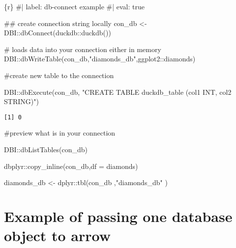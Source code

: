 \documentclass[
  letterpaper,
  DIV=11,
  numbers=noendperiod]{scrreprt}
\newenvironment{Shaded}{\begin{snugshade}}{\end{snugshade}}
\newcommand{\AttributeTok}[1]{\textcolor[rgb]{0.40,0.45,0.13}{#1}}
\newcommand{\FunctionTok}[1]{\textcolor[rgb]{0.28,0.35,0.67}{#1}}
\newcommand{\InformationTok}[1]{\textcolor[rgb]{0.37,0.37,0.37}{#1}}
\newcommand{\NormalTok}[1]{\textcolor[rgb]{0.00,0.23,0.31}{#1}}
\newcommand{\OtherTok}[1]{\textcolor[rgb]{0.00,0.23,0.31}{#1}}
\newcommand{\SpecialCharTok}[1]{\textcolor[rgb]{0.37,0.37,0.37}{#1}}
\newcommand{\StringTok}[1]{\textcolor[rgb]{0.13,0.47,0.30}{#1}}
\begin{document}
\begin{Shaded}
\begin{Highlighting}[]
\InformationTok{\textasciigrave{}\textasciigrave{}\textasciigrave{}\{r\}}
\InformationTok{\#| label: db{-}connect example}
\InformationTok{\#| eval: true}

\InformationTok{\#\# create connection string locally}
\InformationTok{con\_db \textless{}{-} DBI::dbConnect(duckdb::duckdb())}

\InformationTok{\# loads data into your connection either in memory}
\InformationTok{DBI::dbWriteTable(con\_db,"diamonds\_db",ggplot2::diamonds)}

\InformationTok{\#create new table to the connection}

\InformationTok{DBI::dbExecute(con\_db, "CREATE TABLE duckdb\_table (col1 INT, col2 STRING)")}
\InformationTok{\textasciigrave{}\textasciigrave{}\textasciigrave{}}
\end{Highlighting}
\end{Shaded}

\begin{verbatim}
[1] 0
\end{verbatim}

\#preview what is in your connection

\begin{Shaded}
\begin{Highlighting}[]
\NormalTok{DBI}\SpecialCharTok{::}\FunctionTok{dbListTables}\NormalTok{(con\_db)}

\NormalTok{dbplyr}\SpecialCharTok{::}\FunctionTok{copy\_inline}\NormalTok{(con\_db,}\AttributeTok{df =}\NormalTok{ diamonds)}


\NormalTok{diamonds\_db }\OtherTok{\textless{}{-}}\NormalTok{ dplyr}\SpecialCharTok{::}\FunctionTok{tbl}\NormalTok{(con\_db}
\NormalTok{    ,}\StringTok{"diamonds\_db"}
\NormalTok{    )}
\end{Highlighting}
\end{Shaded}

\chapter{Example of passing one database object to
arrow}\label{example-of-passing-one-database-object-to-arrow}
\end{document}

